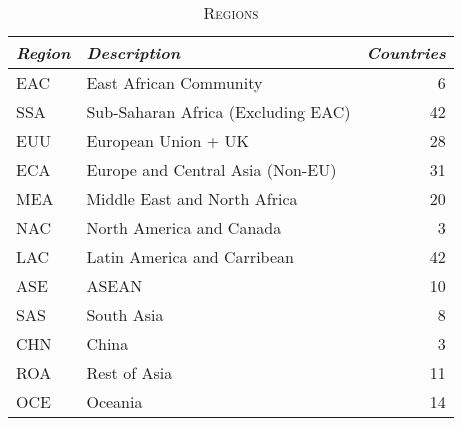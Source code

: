 \documentclass[a4paper]{article}
\begin{document}
\begin{table}[h!]
\centering
\caption{\textsc{Regions}}

\label{tab:ctry}
\vspace{2mm}
\begin{tabular}{llr} \toprule
\textit{Region} & \textit{Description} & \textit{Countries} \\ \midrule
EAC & East African Community & 6 \\
SSA & Sub-Saharan Africa (Excluding EAC) & 42 \\
EUU & European Union + UK & 28 \\
ECA & Europe and Central Asia (Non-EU) & 31 \\
MEA & Middle East and North Africa & 20 \\
NAC & North America and Canada & 3\\
LAC & Latin America and Carribean & 42 \\
ASE & ASEAN & 10 \\
SAS & South Asia & 8 \\
CHN & China & 3 \\
ROA & Rest of Asia & 11 \\
OCE & Oceania & 14
 \\ \bottomrule
\end{tabular}
\end{table}
\end{document}
